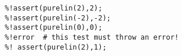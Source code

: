\begin{verbatim}
%!assert(purelin(2),2);
%!assert(purelin(-2),-2);
%!assert(purelin(0),0);
%!error  # this test must throw an error!
%! assert(purelin(2),1);
\end{verbatim}
